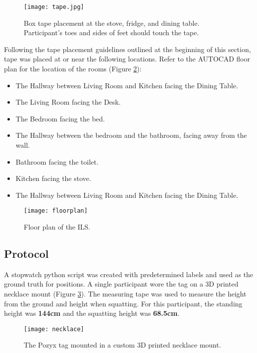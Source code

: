 \begin{figure}[ht]
    \label{fig:tape}
    \centering
    \texttt{[image: tape.jpg]}
    \caption{Box tape placement at the stove, fridge, and dining table. Participant's toes 
    and sides of feet should touch the tape.}
\end{figure}

Following the tape placement guidelines outlined at the beginning of this section,
tape was placed at or near the following locations. Refer to the AUTOCAD floor plan for 
the location of the rooms (Figure \ref{fig:floorplan}):
\begin{itemize}
    \item The Hallway between Living Room and Kitchen facing the Dining Table.
    \item The Living Room facing the Desk.
    \item The Bedroom facing the bed.
    \item The Hallway between the bedroom and the bathroom, facing away from the wall.
    \item Bathroom facing the toilet.
    \item Kitchen facing the stove.
    \item The Hallway between Living Room and Kitchen facing the Dining Table.
\end{itemize}

\begin{figure}[ht]
    \label{fig:floorplan}
    \centering
    \texttt{[image: floorplan]}
    \caption{Floor plan of the ILS.}
\end{figure}


\subsection{Protocol}
A stopwatch python script was created with predetermined labels and used as the ground truth 
for positions. A single participant wore the tag on a 3D printed necklace mount (Figure \ref{fig:necklace}). 
The measuring tape was used to measure the height from the ground and height when squatting.
For this participant, the standing height was \textbf{144cm} and the squatting height was \textbf{68.5cm}.

\begin{figure}[ht]
    \label{fig:necklace}
    \centering
    \texttt{[image: necklace]}
    \caption{The Pozyx tag mounted in a custom 3D printed necklace mount.}
\end{figure}


